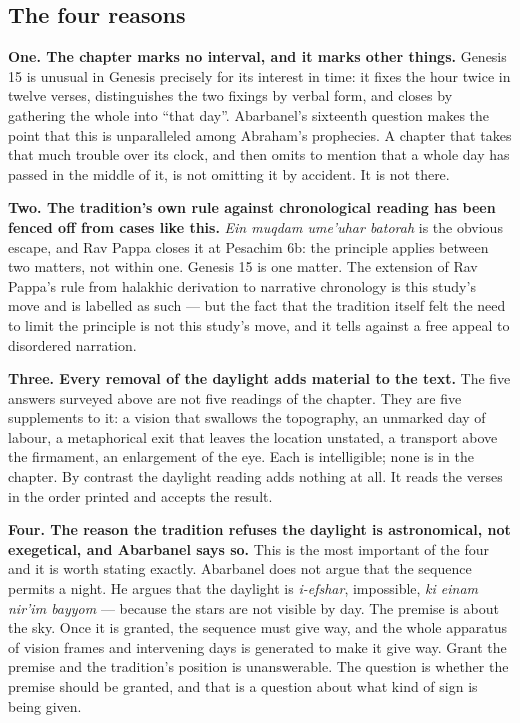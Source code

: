 \subsection{The four reasons}

\textbf{One. The chapter marks no interval, and it marks other things.} Genesis
15 is unusual in Genesis precisely for its interest in time: it fixes the hour
twice in twelve verses, distinguishes the two fixings by verbal form, and closes
by gathering the whole into ``that day''. Abarbanel's sixteenth question makes
the point that this is unparalleled among Abraham's prophecies. A chapter that
takes that much trouble over its clock, and then omits to mention that a whole
day has passed in the middle of it, is not omitting it by accident. It is not
there.

\textbf{Two. The tradition's own rule against chronological reading has been
fenced off from cases like this.} \textit{Ein muqdam ume'uhar batorah} is the
obvious escape, and Rav Pappa closes it at Pesachim 6b: the principle applies
between two matters, not within one. Genesis 15 is one matter. The extension of
Rav Pappa's rule from halakhic derivation to narrative chronology is this study's
move and is labelled as such --- but the fact that the tradition itself felt the
need to limit the principle is not this study's move, and it tells against a free
appeal to disordered narration.

\textbf{Three. Every removal of the daylight adds material to the text.} The
five answers surveyed above are not five readings of the chapter. They are five
supplements to it: a vision that swallows the topography, an unmarked day of
labour, a metaphorical exit that leaves the location unstated, a transport above
the firmament, an enlargement of the eye. Each is intelligible; none is in the
chapter. By contrast the daylight reading adds nothing at all. It reads the
verses in the order printed and accepts the result.

\textbf{Four. The reason the tradition refuses the daylight is astronomical, not
exegetical, and Abarbanel says so.} This is the most important of the four and
it is worth stating exactly. Abarbanel does not argue that the sequence permits a
night. He argues that the daylight is \textit{i-efshar}, impossible,
\textit{ki einam nir'im bayyom} --- because the stars are not visible by day. The
premise is about the sky. Once it is granted, the sequence must give way, and the
whole apparatus of vision frames and intervening days is generated to make it
give way. Grant the premise and the tradition's position is unanswerable. The
question is whether the premise should be granted, and that is a question about
what kind of sign is being given.

